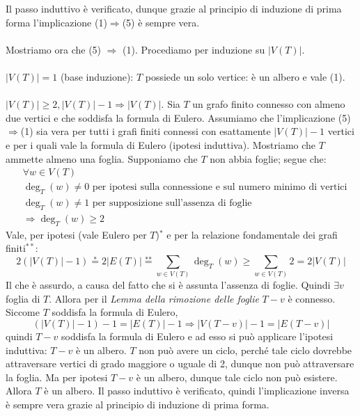 \begin{tcolorbox}[
        enhanced,
        breakable,
        title={Teorema di caratterizzazione degli alberi finiti con formula di Eulero}
    ]
    Il passo induttivo è verificato, dunque grazie al principio di induzione di prima forma
    l'implicazione (1)$\Rightarrow$(5) è sempre vera.
    \\\\
    Mostriamo ora che (5) $\Rightarrow$ (1). Procediamo per induzione su $|V(T)|$.
    \\\\
    $|V(T)|=1$ (base induzione): $T$ possiede un solo vertice: è un albero e vale (1).
    \\\\
    $|V(T)|\geq 2, |V(T)|-1\Longrightarrow|V(T)|$. Sia $T$ un grafo finito
    connesso con almeno due vertici e che soddisfa la formula di Eulero. Assumiamo che l'implicazione
    (5)$\Rightarrow$(1) sia vera per tutti i grafi finiti connessi con esattamente
    $|V(T)|-1$ vertici e per i quali vale la formula di Eulero (ipotesi induttiva).
    Mostriamo che $T$ ammette almeno una foglia.
    Supponiamo che $T$ non abbia foglie; segue che:
    \begin{align*}
        &\forall w\in V(T)\\
        &\deg_T(w)\not = 0 \text{ per ipotesi sulla connessione e sul numero minimo di vertici}\\
        &\deg_T(w)\not = 1 \text{ per supposizione sull'assenza di foglie}\\
        &\Longrightarrow \deg_T(w)\geq 2
    \end{align*}
    Vale, per ipotesi (vale Eulero per $T$)$^*$ e per la relazione fondamentale dei grafi finiti$^{**}$:
    \[ 2(|V(T)|-1)\stackrel{\text{*}}{=}2|E(T)|\stackrel{\text{**}}{=}\sum_{w\in V(T)}\deg_T(w)\geq \sum_{w\in V(T)}2=2|V(T)| \]
    Il che è assurdo, a causa del fatto che si è assunta l'assenza di foglie.
    Quindi $\exists v$ foglia di $T$. Allora per il \textit{Lemma della rimozione delle foglie}
    $T-v$ è connesso.
    Siccome $T$ soddisfa la formula di Eulero,
    \[ (|V(T)|-1) -1 = |E(T)|-1 \Rightarrow |V(T-v)|-1=|E(T-v)|\]
    quindi $T-v$ soddisfa la formula di Eulero
    e ad esso si può applicare l'ipotesi induttiva: $T-v$ è un albero. $T$ non
    può avere un ciclo, perché tale ciclo dovrebbe attraversare vertici di grado
    maggiore o uguale di 2, dunque non può attraversare la foglia. Ma per ipotesi
    $T-v$ è un albero, dunque tale ciclo non può esistere. Allora $T$ è un albero.
    Il passo induttivo è verificato, quindi l'implicazione inversa è sempre vera
    grazie al principio di induzione di prima forma.
    \cvd
\end{tcolorbox}



